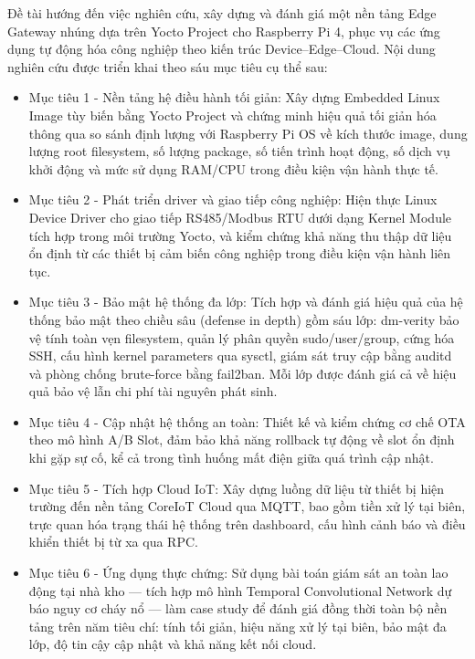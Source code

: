 Đề tài hướng đến việc nghiên cứu, xây dựng và đánh giá một nền tảng Edge Gateway nhúng dựa trên Yocto Project cho Raspberry Pi 4, phục vụ các ứng dụng tự động hóa công nghiệp theo kiến trúc Device–Edge–Cloud. Nội dung nghiên cứu được triển khai theo sáu mục tiêu cụ thể sau:
\begin{itemize}
    \item Mục tiêu 1 - Nền tảng hệ điều hành tối giản: Xây dựng Embedded Linux Image tùy biến bằng Yocto Project và chứng minh hiệu quả tối giản hóa thông qua so sánh định lượng với Raspberry Pi OS về kích thước image, dung lượng root filesystem, số lượng package, số tiến trình hoạt động, số dịch vụ khởi động và mức sử dụng RAM/CPU trong điều kiện vận hành thực tế.
    \item Mục tiêu 2 - Phát triển driver và giao tiếp công nghiệp: Hiện thực Linux Device Driver cho giao tiếp RS485/Modbus RTU dưới dạng Kernel Module tích hợp trong môi trường Yocto, và kiểm chứng khả năng thu thập dữ liệu ổn định từ các thiết bị cảm biến công nghiệp trong điều kiện vận hành liên tục.
    \item Mục tiêu 3 - Bảo mật hệ thống đa lớp: Tích hợp và đánh giá hiệu quả của hệ thống bảo mật theo chiều sâu (defense in depth) gồm sáu lớp: dm-verity bảo vệ tính toàn vẹn filesystem, quản lý phân quyền sudo/user/group, cứng hóa SSH, cấu hình kernel parameters qua sysctl, giám sát truy cập bằng auditd và phòng chống brute-force bằng fail2ban. Mỗi lớp được đánh giá cả về hiệu quả bảo vệ lẫn chi phí tài nguyên phát sinh.
    \item Mục tiêu 4 - Cập nhật hệ thống an toàn: Thiết kế và kiểm chứng cơ chế OTA theo mô hình A/B Slot, đảm bảo khả năng rollback tự động về slot ổn định khi gặp sự cố, kể cả trong tình huống mất điện giữa quá trình cập nhật.
    \item Mục tiêu 5 - Tích hợp Cloud IoT: Xây dựng luồng dữ liệu từ thiết bị hiện trường đến nền tảng CoreIoT Cloud qua MQTT, bao gồm tiền xử lý tại biên, trực quan hóa trạng thái hệ thống trên dashboard, cấu hình cảnh báo và điều khiển thiết bị từ xa qua RPC.
    \item Mục tiêu 6 - Ứng dụng thực chứng: Sử dụng bài toán giám sát an toàn lao động tại nhà kho — tích hợp mô hình Temporal Convolutional Network dự báo nguy cơ cháy nổ — làm case study để đánh giá đồng thời toàn bộ nền tảng trên năm tiêu chí: tính tối giản, hiệu năng xử lý tại biên, bảo mật đa lớp, độ tin cậy cập nhật và khả năng kết nối cloud.
\end{itemize}       

